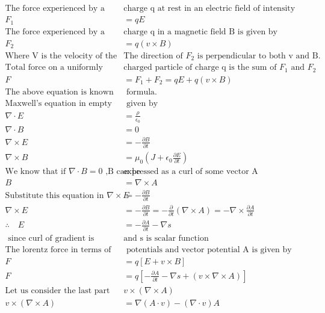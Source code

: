 \begin{align*}
\text{The force experienced by a particle of }&\text{charge q at rest in an electric field of intensity E is given by}\\
F_1&=qE\\
\text{The force experienced by a moving }&\text{charge q in a magnetic field B is given by}\\
F_2&=q(v\times B)\\
\text{Where V  is the velocity of the particle.}&\text{The direction of $F_2$ is perpendicular to both v and B.}\\
\text{Total force on a uniformly moving }&\text{charged particle of charge q is the sum of $F_1$ and $F_2$}\\
F&=F_1+F_2=qE+q(v\times B)\\
\text{The above equation is known as lorentz}&\text{ formula.}\\
\text{Maxwell's equation in empty space is}&\text{ given by}\\
\nabla \cdot E&=\frac{\rho}{\epsilon_0}\\
\nabla \cdot B&=0\\
\nabla \times E&=-\frac{\partial B}{\partial t}\\
\nabla \times B&=\mu_0(J+\epsilon_0\frac{\partial E}{\partial t})\\
\text{We know that if $\nabla \cdot B=0$ ,B can be }&\text{expressed as a curl of some vector A}\\
B&=\nabla \times A\\
\text{Substitute this equation in }\nabla \times E&=-\frac{\partial B}{\partial t}\\
\nabla \times E&=-\frac{\partial B}{\partial t}=-\frac{\partial}{\partial t}(\nabla \times A)=-\nabla \times \frac{\partial A}{\partial t}\\
\therefore \quad E&=-\frac{\partial A}{\partial t}-\nabla s\\
\text{ since curl of gradient is always zero  }&\text{and s is scalar function}\\
\text{The lorentz force in terms of scalar }&\text{  potentials and vector potential A is given by}\\
F&=q\left[ E+v\times B\right] \\
F&=q\left[ -\frac{\partial A}{\partial t}-\nabla s+(v\times \nabla \times A)\right] \\
\text{Let us consider the last part }&v\times(\nabla \times A)\\
v\times(\nabla \times A)&=\nabla (A\cdot v)-(\nabla \cdot v)A\\

\end{align*}
